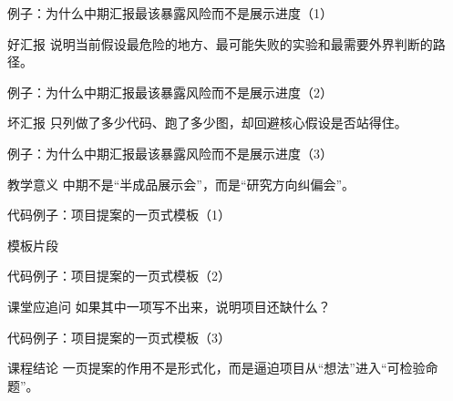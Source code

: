 \begin{frame}{例子：为什么中期汇报最该暴露风险而不是展示进度（1）}
\begin{block}{好汇报}
    说明当前假设最危险的地方、最可能失败的实验和最需要外界判断的路径。
  \end{block}
\end{frame}

\begin{frame}{例子：为什么中期汇报最该暴露风险而不是展示进度（2）}
\begin{block}{坏汇报}
    只列做了多少代码、跑了多少图，却回避核心假设是否站得住。
  \end{block}
\end{frame}

\begin{frame}{例子：为什么中期汇报最该暴露风险而不是展示进度（3）}
\begin{block}{教学意义}
    中期不是“半成品展示会”，而是“研究方向纠偏会”。
  \end{block}
\end{frame}

\begin{frame}{代码例子：项目提案的一页式模板（1）}
\begin{block}{模板片段}
    {\ttfamily\small
    \par
    \par
    \par
    \par
    }
  \end{block}
\end{frame}

\begin{frame}{代码例子：项目提案的一页式模板（2）}
\begin{block}{课堂应追问}
    如果其中一项写不出来，说明项目还缺什么？
  \end{block}
\end{frame}

\begin{frame}{代码例子：项目提案的一页式模板（3）}
\begin{block}{课程结论}
    一页提案的作用不是形式化，而是逼迫项目从“想法”进入“可检验命题”。
  \end{block}
\end{frame}

